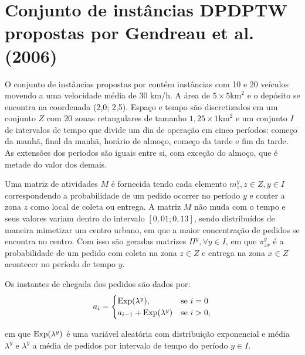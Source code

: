 





\section{Conjunto de instâncias DPDPTW propostas por 
         Gendreau et al. (2006)} 
\label{sec:gendreau_instances}

O conjunto de instâncias propostas por \textcite{gendreau_neighborhood_2006}
contém instâncias com 10 e 20 veículos movendo a uma velocidade média de 30 
km/h. 
A área de $5 \times 5 \text{km}^2$  e o depósito se encontra na coordenada 
(2,0; 2,5). 
Espaço e tempo são discretizados em um conjunto $Z$ com 20 zonas retangulares 
de tamanho $1,25 \times 1 \text{km}^2$ e um conjunto $I$ de intervalos de tempo
que divide um dia de operação em cinco períodos: começo da manhã, final da 
manhã, horário de almoço, começo da tarde e fim da tarde.
As extensões dos períodos são iguais entre si, com exceção do almoço, que é
metade do valor dos demais.

Uma matriz de atividades $M$ é fornecida tendo cada elemento 
$m_z^y, z \in Z, y \in I$ correspondendo a probabilidade de um pedido 
ocorrer no período $y$ e conter a zona $z$ como local de coleta ou entrega. 
A matriz $M$ não muda com o tempo e seus valores variam dentro do intervalo
$[0,01; 0,13]$, sendo distribuídos de maneira mimetizar um centro urbano, em
que a maior concentração de pedidos se encontra no centro.
Com isso são geradas matrizes $\Pi^y, \forall y \in I$, em que $\pi_{zx}^y$ é a
probabilidade de um pedido com coleta na zona $z \in Z$ e entrega na zona $x
\in Z$ acontecer no período de tempo $y$.

Os instantes de chegada dos pedidos são dados por:
%
\begin{equation}
   a_{i} =
   \begin{cases}
       \text{Exp}(\lambda^y),                     & \text{se $i = 0$} \\
       a_{i-1} +\text{Exp}(\lambda^y) & \text{se $i > 0$},
     \end{cases}
\end{equation}

\noindent em que $\text{Exp}(\lambda^y)$ é uma variável aleatória com 
distribuição exponencial e média $\lambda^y$ e $\lambda^y$ a média de pedidos 
por intervalo de tempo do período $y \in I$.

